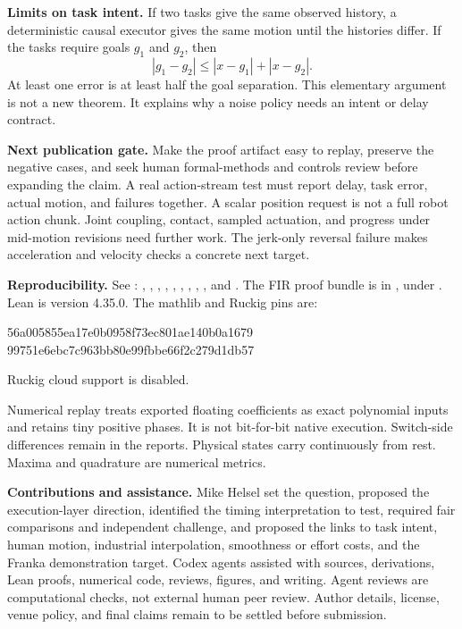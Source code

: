 \documentclass[11pt,letterpaper]{article}
\begin{document}
{\textbf{Limits on task intent.} If two tasks give the same observed history, a deterministic causal executor gives the same motion until the histories differ. If the tasks require goals $g_1$ and $g_2$, then
\[
|g_1-g_2|\leq |x-g_1|+|x-g_2|.
\]
At least one error is at least half the goal separation. This elementary argument is not a new theorem. It explains why a noise policy needs an intent or delay contract.

\textbf{Next publication gate.} Make the proof artifact easy to replay, preserve the negative cases, and seek human formal-methods and controls review before expanding the claim. A real action-stream test must report delay, task error, actual motion, and failures together. A scalar position request is not a full robot action chunk. Joint coupling, contact, sampled actuation, and progress under mid-motion revisions need further work. The jerk-only reversal failure makes acceleration and velocity checks a concrete next target.

{\small\raggedright\textbf{Reproducibility.} See : , , , , , , , , , and . The FIR proof bundle is in , under . Lean is version 4.35.0. The mathlib and Ruckig pins are:\par}
\begin{center}\small\ttfamily
56a005855ea17e0b0958f73ec801ae140b0a1679\\
99751e6ebc7c963bb80e99fbbe66f2c279d1db57
\end{center}
Ruckig cloud support is disabled.

Numerical replay treats exported floating coefficients as exact polynomial inputs and retains tiny positive phases. It is not bit-for-bit native execution. Switch-side differences remain in the reports. Physical states carry continuously from rest. Maxima and quadrature are numerical metrics.

\textbf{Contributions and assistance.} Mike Helsel set the question, proposed the execution-layer direction, identified the timing interpretation to test, required fair comparisons and independent challenge, and proposed the links to task intent, human motion, industrial interpolation, smoothness or effort costs, and the Franka demonstration target. Codex agents assisted with sources, derivations, Lean proofs, numerical code, reviews, figures, and writing. Agent reviews are computational checks, not external human peer review. Author details, license, venue policy, and final claims remain to be settled before submission.

}
\end{document}
